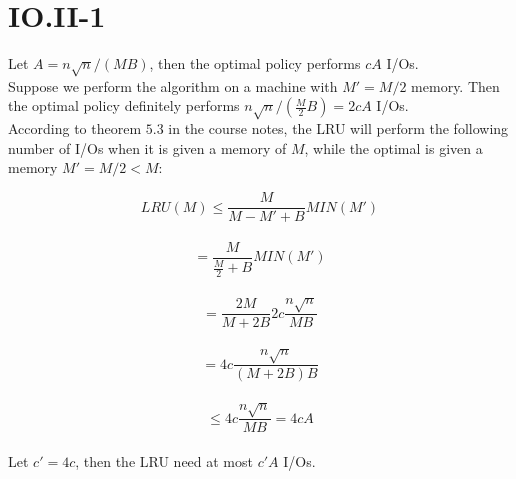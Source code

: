 \section*{IO.II-1}
Let $A = n\sqrt{n} / (M B)$, then the optimal policy performs $cA$ I/Os.\\

Suppose we perform the algorithm on a machine with $M' = M / 2$ memory. Then the optimal policy definitely performs $n\sqrt{n} / (\frac{M}{2} B) = 2cA$ I/Os. \\

According to theorem $5.3$ in the course notes, the LRU will perform the following number of I/Os when it is given a memory of $M$, while the optimal is given a memory $M' = M / 2 < M$:

$$LRU(M) \leq \frac{M}{M - M' + B} MIN(M')$$ \\
$$= \frac{M}{\frac{M}{2} + B} MIN(M')$$ \\ 
$$= \frac{2M}{M + 2B}2c\frac{n\sqrt{n}}{MB}$$ \\
$$= 4c\frac{n\sqrt{n}}{(M + 2B)B}$$ \\
$$\leq 4c\frac{n\sqrt{n}}{MB} = 4cA$$ \\ 

Let $c' = 4c$, then the LRU need at most $c'A$ I/Os.
